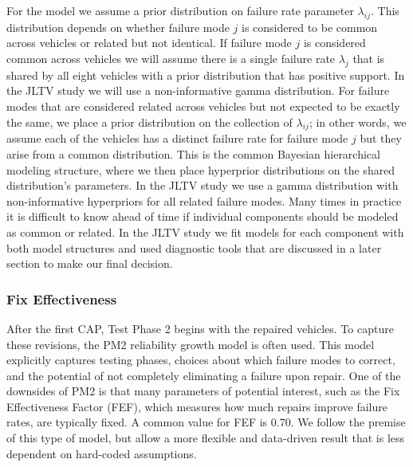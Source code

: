 \documentclass[12pt]{article}
\begin{document}

For the model we assume a prior distribution on failure rate parameter
$\lambda_{ij}$.  This distribution depends on whether failure mode $j$ is
considered to be common across vehicles or related but not identical.  If
failure mode $j$ is considered common across vehicles we will assume there is a
single failure rate $\lambda_j$ that is shared by all eight vehicles with a
prior distribution that has positive support.  In the JLTV study we will use a
non-informative gamma distribution.  For failure modes that are considered
related across vehicles but not expected to be exactly the same, we place a
prior distribution on the collection of $\lambda_{ij}$; in other words, we
assume each of the vehicles has a distinct failure rate for failure mode $j$ but
they arise from a common distribution.  This is the common Bayesian hierarchical
modeling structure, where we then place  hyperprior distributions on the shared
distribution's parameters.  In the JLTV study we use a gamma distribution with
non-informative hyperpriors for all related failure modes.  Many times in
practice  it is difficult to know ahead of time if individual components should
be modeled  as common or related.  In the JLTV study we fit models for each
component with both model structures and used diagnostic tools  that are
discussed in a later section to make our final decision.

\subsubsection{Fix Effectiveness}
After the first CAP, Test Phase 2 begins with the repaired vehicles. To capture
these revisions, the PM2 reliability growth model \cite{ref2} is often used.
This model explicitly captures testing phases, choices about which failure modes
to correct, and the potential of not completely eliminating a failure upon
repair. One of the downsides of PM2 is that many parameters of potential
interest, such as the Fix Effectiveness Factor (FEF), which measures how much
repairs improve failure rates, are typically fixed. A common value for FEF is
0.70. We follow the premise of this type of model, but allow a more flexible and
data-driven result that is less dependent on hard-coded assumptions.
\end{document}
